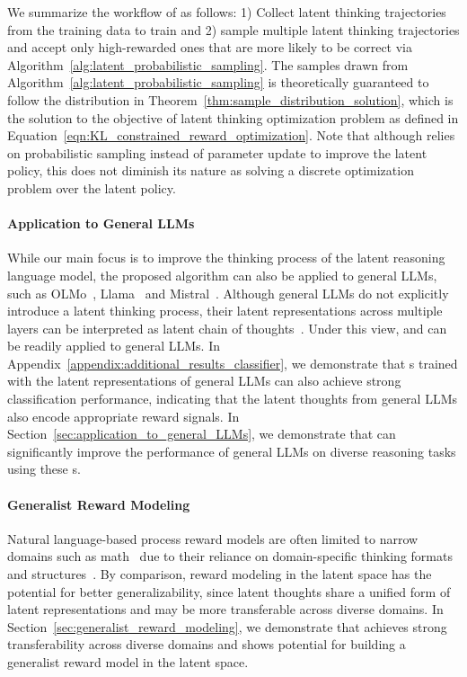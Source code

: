 \documentclass{article} %
\begin{document}
We summarize the workflow of \LTO as follows: 1) Collect latent thinking trajectories from the training data to train \LRM and 2) sample multiple latent thinking trajectories and accept only high-rewarded ones that are more likely to be correct via Algorithm~\ref{alg:latent_probabilistic_sampling}. The samples drawn from Algorithm~\ref{alg:latent_probabilistic_sampling} is theoretically guaranteed to follow the distribution in Theorem~\ref{thm:sample_distribution_solution}, which is the solution to the objective of latent thinking optimization problem as defined in Equation~\ref{eqn:KL_constrained_reward_optimization}. Note that although \LTO relies on probabilistic sampling instead of parameter update to improve the latent policy, this does not diminish its nature as solving a discrete optimization problem over the latent policy.
\paragraph*{Application to General LLMs}
While our main focus is to improve the thinking process of the latent reasoning language model, the proposed \LTO algorithm can also be applied to general LLMs, such as OLMo~\citep{groeneveld2024olmo}, Llama~\citep{touvron2023llama2} and Mistral~\citep{jiang2023mistral}. 
%
Although general LLMs do not explicitly introduce a latent thinking process, their latent representations across multiple layers can be interpreted as latent chain of thoughts~\citep{wang2025latent}.
Under this view, \LRM and \LTO can be readily applied to general LLMs. In Appendix~\ref{appendix:additional_results_classifier}, we demonstrate that {\LRM}s trained with the latent representations of general LLMs can also achieve strong classification performance, indicating that the latent thoughts from general LLMs also encode appropriate reward signals. In Section~\ref{sec:application_to_general_LLMs}, we demonstrate that \LTO can significantly improve the performance of general LLMs on diverse reasoning tasks using these {\LRM}s.
\paragraph*{Generalist Reward Modeling}
Natural language-based process reward models are often limited to narrow domains such as math~\citep{wang-etal-2024-math,lu2024autopsv} due to their reliance on domain-specific thinking formats and structures~\citep{zeng2025versaprm}. 
%
By comparison, reward modeling in the latent space has the potential for better generalizability, since latent thoughts share a unified form of latent representations and may be more transferable across diverse domains. In Section~\ref{sec:generalist_reward_modeling}, we demonstrate that \LRM achieves strong transferability across diverse domains and shows potential for building a
generalist reward model in the latent space.
%
\end{document}
